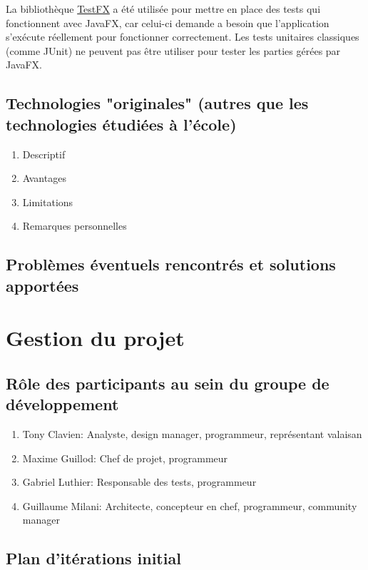 \documentclass[a4paper,11pt]{article}
\begin{document}
	La bibliothèque \href{https://github.com/TestFX/TestFX}{TestFX} a été utilisée pour mettre en place des tests qui fonctionnent avec JavaFX, car celui-ci demande a besoin que l'application s'exécute réellement pour fonctionner correctement. Les tests unitaires classiques (comme JUnit) ne peuvent pas être utiliser pour tester les parties gérées par JavaFX.
	
	
	\subsection{Technologies "originales" (autres que les technologies étudiées à l'école)}
	\begin{enumerate}
		\item Descriptif
		\item Avantages
		\item Limitations
		\item Remarques personnelles
	\end{enumerate}
	
	\subsection{Problèmes éventuels rencontrés et solutions apportées}
	
	
	\section{Gestion du projet}
	
	
	\subsection{Rôle des participants au sein du groupe de développement}
	\begin{enumerate}
		\item Tony Clavien: Analyste, design manager, programmeur, représentant valaisan
		\item Maxime Guillod: Chef de projet, programmeur
		\item Gabriel Luthier: Responsable des tests, programmeur
		\item Guillaume Milani: Architecte, concepteur en chef, programmeur, community manager
	\end{enumerate}
	
	\subsection{Plan d'itérations initial}
	
\end{document}
